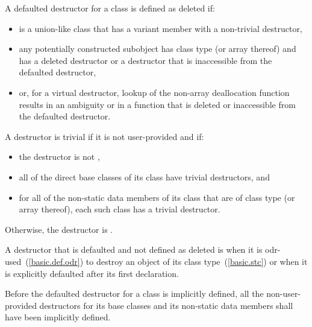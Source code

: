 \pnum
A defaulted destructor for a class
   is defined as deleted if:
\begin{itemize}
\item {} is a union-like class that has a variant
  member with a non-trivial destructor,

\item any potentially constructed subobject has class type
   (or array thereof) and
   has a deleted destructor or a destructor
  that is inaccessible from the defaulted destructor,

\item or, for a virtual destructor, lookup of the non-array deallocation
  function results in an ambiguity or in a function that is deleted or
  inaccessible from the defaulted destructor.
\end{itemize}

A destructor is trivial if it is not user-provided and if:

\begin{itemize}
\item the destructor is not ,

\item all of the direct base classes of its class have trivial destructors, and

\item for all of the non-static data members of its class that are of class
type (or array thereof), each such class has a trivial destructor.
\end{itemize}

Otherwise, the destructor is
.

\pnum
{}%
A destructor
that is defaulted and not defined as deleted
is
when it is odr-used~(\ref{basic.def.odr}) to destroy an object of its class type~(\ref{basic.stc})
or when it is explicitly defaulted after its first declaration.

\pnum
Before the
defaulted destructor for a class is implicitly defined, all the non-user-provided
destructors for its base classes and its non-static data members shall have been
implicitly defined.

